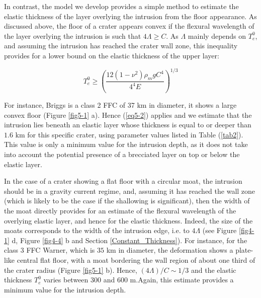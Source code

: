\begin{article}
        In contrast, the model we  develop provides a simple method to
        estimate  the elastic  thickness  of the  layer overlying  the
        intrusion from  the floor appearance. As  discussed above, the
        floor of a crater appears convex if the flexural wavelength of
        the   layer    overlying   the   intrusion   is    such   that
        $4 \Lambda \ge  C$. As $\Lambda$ mainly  depends on $T_{e}^0$,
        and assuming the  intrusion has reached the  crater wall zone,
        this  inequality provides  for a  lower bound  on the  elastic
        thickness of the upper layer:
		 
		\begin{equation}
                  T_{e}^0 \ge \left(\frac{12(1-\nu^{2})\rho_{m}gC^{4}}{4^4 E}\right)^{1/3}
                  \label{eq5-2}
		\end{equation}

                For instance,  Briggs is  a class  2 FFC  of 37  km in
                diameter,  it  shows  a  large  convex  floor  (Figure
                \ref{fig5-1}  a). Hence  (\ref{eq5-2}) applies  and we
                estimate that  the intrusion  lies beneath  an elastic
                layer whose thickness is equal to or deeper than $1.6$
                km for  this specific  crater, using  parameter values
                listed  in Table  (\ref{tab2}). This  value is  only a
                minimum value for the intrusion  depth, as it does not
                take  into   account  the  potential  presence   of  a
                brecciated layer on top or below the elastic layer.
		
                In the  case of a crater  showing a flat floor  with a
                circular moat,  the intrusion  should be in  a gravity
                current regime, and, assuming  it has reached the wall
                zone (which is likely to be the case if the shallowing
                is significant),  then the width of  the moat directly
                provides for an estimate of the flexural wavelength of
                the overlying elastic layer, and hence for the elastic
                thickness. Indeed,  the size of the  moats corresponds
                to the width of the intrusion edge, i.e. to $4\Lambda$
                (see Figure \ref{fig4-1} d,  Figure \ref{fig4-4} b and
                Section  \ref{Constant_Thickness}). For  instance, for
                the class 3 FFC Warner,  which is $35$ km in diameter,
                the deformation shows a plate-like central flat floor,
                with a  moat bordering  the wall  region of  about one
                third  of  the   crater  radius  (Figure  \ref{fig5-1}
                b).  Hence,  $(4\Lambda)/C\sim  1/3$ and  the  elastic
                thickness  $T_e^0$ varies  between  $300$  and $600  $
                m.Again, this  estimate provides  a minimum  value for
                the intrusion depth.
			

\end{article}
